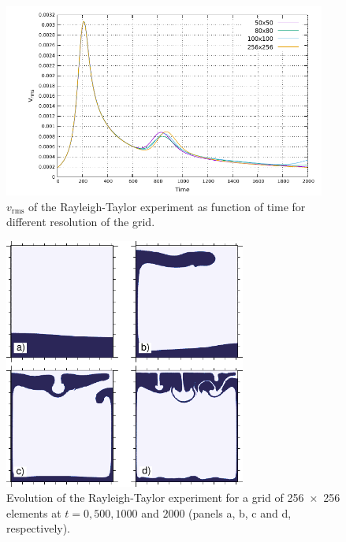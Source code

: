 \documentclass[hidelinks,10pt,a4paper]{article}
\begin{document}
\begin{figure}
\centering
\noindent\includegraphics[width=400px]{./Figures/RT.pdf}
\caption{$v_{\textrm{rms}}$ of the Rayleigh-Taylor experiment as function of time for different resolution of the grid.}
\label{fig:RT}
\end{figure}

\begin{figure}
\centering
\noindent\includegraphics[width=300px]{./Figures/Rayleigh.pdf}
\caption{Evolution of the Rayleigh-Taylor experiment for a grid of \num{256x256} elements at $t=0, 500, 1000$ and $2000$ (panels a, b, c and d, respectively).}
\label{fig:rayleigh}
\end{figure}
\end{document}
